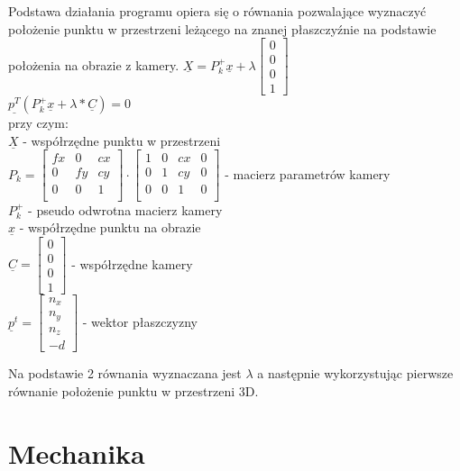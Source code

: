 \documentclass[conference]{IEEEtran}
\begin{document}
Podstawa działania programu opiera się o równania pozwalające wyznaczyć położenie punktu w przestrzeni leżącego na znanej płaszczyźnie na podstawie położenia na obrazie z kamery.
$\underline{X}={P_k^+}\underline{x}+\lambda 
\begin{bmatrix}
    0\\
    0\\
	0\\
    1
\end{bmatrix}$\\
$\underline{p^T}({P_k^+}\underline{x}+\lambda*\underline{C})=0$
\\
przy czym:
\\
$\underline{X}$ - współrzędne punktu w przestrzeni\\
$P_k=
\begin{bmatrix}
    fx&0&cx\\
    0&fy&cy\\
	0&0&1\\
\end{bmatrix}\cdot
\begin{bmatrix}
    1&0&cx&0\\
    0&1&cy&0\\
	0&0&1&0\\
\end{bmatrix}$ - macierz parametrów kamery\\
${P_k^+}$ - pseudo odwrotna macierz kamery\\
$\underline{x}$ - współrzędne punktu na obrazie\\
$\underline{C}=
\begin{bmatrix}
    0\\
    0\\
	0\\
    1
\end{bmatrix}$ - współrzędne kamery\\
$\underline{p}^t = 
\begin{bmatrix}
    n_x\\
    n_y\\
	n_z\\
    -d
\end{bmatrix}$ - wektor płaszczyzny

Na podstawie 2 równania wyznaczana jest $\lambda$ a następnie wykorzystując pierwsze równanie położenie punktu w przestrzeni 3D.

\section{Mechanika}
\end{document}
